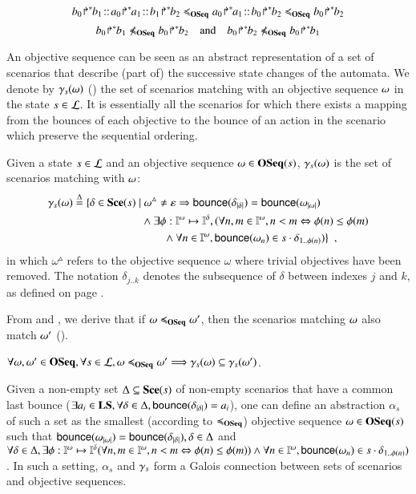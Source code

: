 \begin{example}
\[\obj{b_0}{b_1}\concat\obj{a_0}{a_1}\concat\obj{b_1}{b_2}
\ltw
\obj{a_0}{a_1}\concat\obj{b_0}{b_2}
\ltw
\obj{b_0}{b_2}\]
\[\obj{b_0}{b_1}\not\ltw\obj{b_0}{b_2}
\quad\text{and}\quad
\obj{b_0}{b_2}\not\ltw\obj{b_0}{b_1}\]
\end{example}

An objective sequence can be seen as an abstract representation of a set of scenarios that describe
(part of) the successive state changes of the automata.
We denote by $\gamma_s(\omega)$ () the set of scenarios matching with an objective sequence
$\omega$ in the state $s\in\mathcal{L}$.
It is essentially all the scenarios for which there exists a mapping from the bounces of each
objective to the bounce of an action in the scenario which preserve the sequential ordering.

\begin{definition}[$\concr: \OS \to \powerset(\Sce)$]\label{def:concr}
Given a state $s\in\mathcal{L}$ and an objective sequence
$\omega\in\mathbf{OSeq}(s)$, $\gamma_s(\omega)$ is the set of scenarios matching with $\omega$:
\begin{align*}
\concr(\w) \DEF \{ \delta\in\Sce(s)\mid &\ 
\w^\vartriangle\neq \emptyseq\Rightarrow
\bounce{\delta_{\card\delta}} = \bounce{\w_{\card\w}}
\\ &
 \wedge \exists \phi:\indexes{\w}\mapsto\indexes{\delta},
    (\forall n,m\in\indexes{\w}, n<m \Leftrightarrow \phi(n)\leq\phi(m)
\\ & \qquad
	\wedge \forall n\in\indexes{\w},
	  \bounce{\w_n} \in s\play\delta_{1..\phi(n)})
\}
\enspace,
\end{align*}
in which $\omega^\vartriangle$ refers to the objective sequence $\omega$ where
trivial objectives have been removed.
The notation $\delta_{j..k}$
denotes the subsequence of $\delta$ between indexes $j$ and $k$,
as defined on page \pageref{notations}.
\end{definition}

From  and , we derive that if
$\omega \preccurlyeq_{\mathbf{OSeq}} \omega'$, then the scenarios matching $\omega$ also match $\omega'$ ().
\begin{lemma}\label{lem:ltw}
$\forall \omega, \omega' \in \mathbf{OSeq}, \forall s \in \mathcal{L},
\omega\preccurlyeq_{\mathbf{OSeq}}\omega' \Longrightarrow \gamma_s(\omega)\subseteq\gamma_s(\omega')$\enspace.
\end{lemma}

Given a non-empty set $\Delta\subseteq\mathbf{Sce}(s)$ of non-empty scenarios that have a common last bounce
($\exists a_i\in\mathbf{LS}, \forall\delta\in\Delta,
\mathsf{bounce}(\delta_{|\delta|})=a_i$), one can define an abstraction $\alpha_s$ of
such a set as the smallest (according to $\preccurlyeq_{\mathbf{OSeq}}$) objective sequence $\omega\in\mathbf{OSeq}(s)$ such that
$\mathsf{bounce}(\omega_{|\omega|}) = \mathsf{bounce}(\delta_{|\delta|}), \delta\in\Delta$
and
$\forall\delta\in\Delta, \exists \phi:\mathbb{I}^{\omega}\mapsto\mathbb{I}^{\delta}
    (\forall n,m\in\mathbb{I}^{\omega}, n<m \Leftrightarrow \phi(n)\leq\phi(m))
	\wedge \forall n\in\mathbb{I}^{\omega},
	  \mathsf{bounce}(\omega_n) \in s\cdot\delta_{1..\phi(n)})$.
In such a setting, $\alpha_s$ and $\gamma_s$ form a Galois connection between sets
of scenarios and objective sequences.


